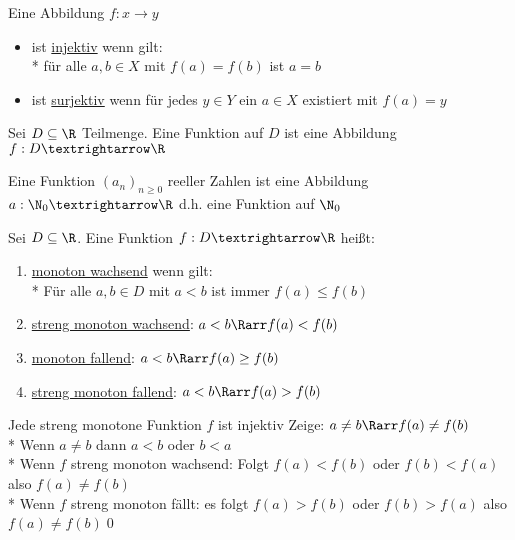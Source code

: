 \wdh
Eine Abbildung $f:x→y$
\begin{itemize}
\item{ist \ul{injektiv} wenn gilt:\\*
für alle $a,b\in X$ mit $f(a)=f(b)$ ist $a=b$}
\item{ist \ul{surjektiv} wenn für jedes $y\in Y$ ein $a\in X$ existiert mit $f(a)=y$}
\end{itemize}
Sei $D\subseteq\R$ Teilmenge. Eine Funktion auf $D$ ist eine Abbildung $f:D→\R$

\bem
Eine Funktion $(a_n)_{n\geq 0}$ reeller Zahlen ist eine Abbildung $a:\N_0→\R$ d.h. eine Funktion auf $\N_0$

Sei $D\subseteq\R$. Eine Funktion  $f:D→\R$ heißt:
\begin{enumerate}
\item{\ul{monoton wachsend} wenn gilt:\\*
Für alle $a,b\in D$ mit $a<b$ ist immer $f(a)\leq f(b)$}
\item{\ul{streng monoton wachsend}: $a<b\Rarr f(a)<f(b)$}
\item{\ul{monoton fallend}: $a<b\Rarr f(a)\geq f(b)$}
\item{\ul{streng monoton fallend}: $a<b\Rarr f(a)> f(b)$}
\end{enumerate}
%
\bem
Jede streng monotone Funktion $f$ ist injektiv
%
\bew
Zeige: $a\neq b\Rarr f(a)\neq f(b)$\\*
Wenn $a\neq b$ dann $a< b$ oder $b<a$\\*
Wenn $f$ streng monoton wachsend: Folgt $f(a)< f(b)$ oder $f(b)< f(a)$ also $f(a)\neq f(b)$\\*
Wenn $f$ streng monoton fällt: es folgt $f(a)> f(b)$ oder $f(b)> f(a)$ also $f(a)\neq f(b)$\qed

